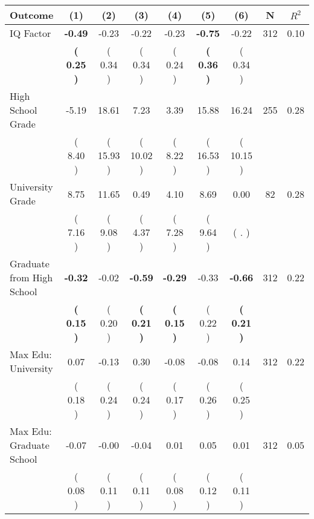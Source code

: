 \begin{tabular}{lcccccccc}
\toprule
 \textbf{Outcome} & \textbf{(1)} & \textbf{(2)} & \textbf{(3)} & \textbf{(4)} & \textbf{(5)} & \textbf{(6)} & \textbf{N} & \textbf{$ R^2$} \\
\midrule
IQ Factor & \textbf{    -0.49} &     -0.23 &     -0.22 &     -0.23 & \textbf{    -0.75} &     -0.22 & 312 &       0.10 \\ 
 & \textbf{(     0.25 )} & (     0.34 ) & (     0.34 ) & (     0.24 ) & \textbf{(     0.36 )} & (     0.34 ) & \\
High School Grade &     -5.19 &     18.61 &      7.23 &      3.39 &     15.88 &     16.24 & 255 &       0.28 \\ 
 & (     8.40 ) & (    15.93 ) & (    10.02 ) & (     8.22 ) & (    16.53 ) & (    10.15 ) & \\
University Grade &      8.75 &     11.65 &      0.49 &      4.10 &      8.69 &      0.00 & 82 &       0.28 \\ 
 & (     7.16 ) & (     9.08 ) & (     4.37 ) & (     7.28 ) & (     9.64 ) & (        . ) & \\
Graduate from High School & \textbf{    -0.32} &     -0.02 & \textbf{    -0.59} & \textbf{    -0.29} &     -0.33 & \textbf{    -0.66} & 312 &       0.22 \\ 
 & \textbf{(     0.15 )} & (     0.20 ) & \textbf{(     0.21 )} & \textbf{(     0.15 )} & (     0.22 ) & \textbf{(     0.21 )} & \\
Max Edu: University &      0.07 &     -0.13 &      0.30 &     -0.08 &     -0.08 &      0.14 & 312 &       0.22 \\ 
 & (     0.18 ) & (     0.24 ) & (     0.24 ) & (     0.17 ) & (     0.26 ) & (     0.25 ) & \\
Max Edu: Graduate School &     -0.07 &     -0.00 &     -0.04 &      0.01 &      0.05 &      0.01 & 312 &       0.05 \\ 
 & (     0.08 ) & (     0.11 ) & (     0.11 ) & (     0.08 ) & (     0.12 ) & (     0.11 ) & \\
\bottomrule
\end{tabular}
